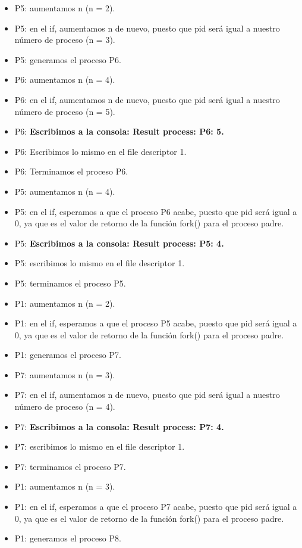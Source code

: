 \documentclass[spanish]{article}
\begin{document}
\begin{itemize}
\item P5: aumentamos n (n = 2).
\item P5: en el if, aumentamos n de nuevo, puesto que pid
será igual a nuestro número de proceso (n = 3).
\item P5: generamos el proceso P6.

\item P6: aumentamos n (n = 4).
\item P6: en el if, aumentamos n de nuevo, puesto que pid
será igual a nuestro número de proceso (n = 5).
\item P6: \textbf{Escribimos a la consola: Result process:
P6: 5.}
\item P6: Escribimos lo mismo en el file descriptor 1.
\item P6: Terminamos el proceso P6.

\item P5: aumentamos n (n = 4).
\item P5: en el if, esperamos a que el proceso P6 acabe,
puesto que pid será igual a 0, ya que es el valor de retorno
de la función fork() para el proceso padre.
\item P5: \textbf{Escribimos a la consola: Result process:
P5: 4.}
\item P5: escribimos lo mismo en el file descriptor 1.
\item P5: terminamos el proceso P5.

\item P1: aumentamos n (n = 2).
\item P1: en el if, esperamos a que el proceso P5 acabe,
puesto que pid será igual a 0, ya que es el valor de retorno
de la función fork() para el proceso padre.
\item P1: generamos el proceso P7.

\item P7: aumentamos n (n = 3).
\item P7: en el if, aumentamos n de nuevo, puesto que pid
será igual a nuestro número de proceso (n = 4).
\item P7: \textbf{Escribimos a la consola: Result process:
P7: 4.}
\item P7: escribimos lo mismo en el file descriptor 1.
\item P7: terminamos el proceso P7.

\item P1: aumentamos n (n = 3).
\item P1: en el if, esperamos a que el proceso P7 acabe,
puesto que pid será igual a 0, ya que es el valor de retorno
de la función fork() para el proceso padre.
\item P1: generamos el proceso P8.


\end{itemize}
\end{document}
